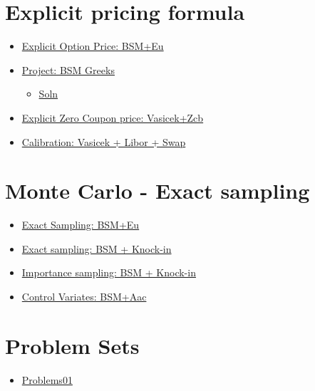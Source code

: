 \documentclass[11pt]{article}
\providecommand{\tightlist}{%
      \setlength{\itemsep}{0pt}\setlength{\parskip}{0pt}}
\begin{document}
    \section{Explicit pricing formula}\label{explicit-pricing-formula}

\begin{itemize}
\tightlist
\item
  \href{./src/explicit_bsm_eu.ipynb}{Explicit Option Price: BSM+Eu}
\item
  \href{./src/explicit_bsm_greeks.ipynb}{Project: BSM Greeks}

  \begin{itemize}
  \tightlist
  \item
    \href{./src/explicit_bsm_greeks_soln.ipynb}{Soln}
  \end{itemize}
\item
  \href{./src/explicit_vasicek_zcb.ipynb}{Explicit Zero Coupon price:
  Vasicek+Zcb}
\item
  \href{./src/calibration_vasicek_libor_swap.ipynb}{Calibration: Vasicek
  + Libor + Swap}
\end{itemize}

\section{Monte Carlo - Exact
sampling}\label{monte-carlo---exact-sampling}

\begin{itemize}
\tightlist
\item
  \href{./src/es_bsm_eu.ipynb}{Exact Sampling: BSM+Eu}
\item
  \href{./src/es_bsm_knock_in.ipynb}{Exact sampling: BSM + Knock-in}
\item
  \href{./src/is_bsm_knock_in.ipynb}{Importance sampling: BSM +
  Knock-in}
\item
  \href{./src/control_variates_bsm_aac.ipynb}{Control Variates: BSM+Aac}
\end{itemize}

\section{Problem Sets}\label{problem-sets}

\begin{itemize}
\tightlist
\item
  \href{./src/problems01.ipynb}{Problems01}
\end{itemize}


    
    
    
    
\end{document}
